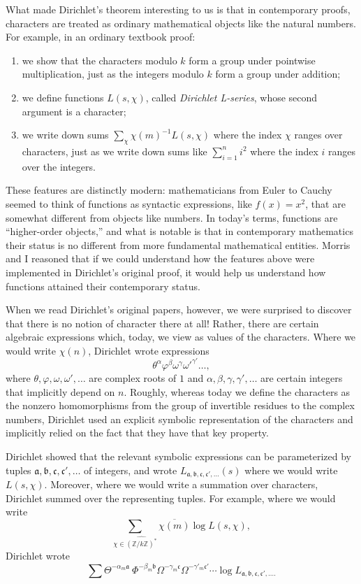 \documentclass[12pt]{article}
\newcommand{\ph}{\varphi}
\begin{document}
What made Dirichlet's theorem interesting to us is that in contemporary proofs, characters are treated as ordinary mathematical objects like the natural numbers. For example, in an ordinary textbook proof:
\begin{enumerate}
\item we show that the characters modulo $k$ form a group under pointwise multiplication, just as the integers modulo $k$ form a group under addition;
\item we define functions $L(s, \chi)$, called \emph{Dirichlet L-series}, whose second argument is a character;
\item we write down sums $\sum_\chi \chi(m)^{-1} L(s, \chi)$ where the index $\chi$ ranges over characters, just as we write down sums like $\sum_{i = 1}^{n} i^2$ where the index $i$ ranges over the integers.
\end{enumerate}
These features are distinctly modern: mathematicians from Euler to Cauchy seemed to think of functions as syntactic expressions, like $f(x) = x^2$, that are somewhat different from objects like numbers. In today's terms, functions are ``higher-order objects,'' and what is notable is that in contemporary mathematics their status is no different from more fundamental mathematical entities. Morris and I reasoned that if we could understand how the features above were implemented in Dirichlet's original proof, it would help us understand how functions attained their contemporary status. 

When we read Dirichlet's original papers, however, we were surprised to discover that there is no notion of character there at all! Rather, there are certain algebraic expressions which, today, we view as values of the characters. Where we would write $\chi(n)$, Dirichlet wrote expressions
\[
\theta^\alpha \ph^\beta \omega^\gamma \omega'^{\gamma'} \ldots,
\]
where $\theta, \ph, \omega, \omega', \ldots$ are complex roots of $1$ and $\alpha, \beta, \gamma, \gamma', \ldots$ are certain integers that implicitly depend on $n$. Roughly, whereas today we define the characters as the nonzero homomorphisms from the group of invertible residues to the complex numbers, Dirichlet used an explicit symbolic representation of the characters and implicitly relied on the fact that they have that key property.

Dirichlet showed that the relevant symbolic expressions can be parameterized by tuples $\mathfrak{a}, \mathfrak{b}, \mathfrak{c}, \mathfrak{c}', \ldots$ of integers, and wrote $L_{\mathfrak{a}, \mathfrak{b}, \mathfrak{c}, \mathfrak{c}',\ldots}(s)$ where we would write $L(s,\chi)$. Moreover, where we would write a summation over characters, Dirichlet summed over the representing tuples. For example, where we would write
\[
\sum_{\chi \in \widehat{(\mathbb{Z} / k \mathbb{Z})^*}}\overline{\chi(m)}\log L(s, \chi),
\]
Dirichlet wrote 
\[
\sum \Theta^{-\alpha_{m}\mathfrak{a}}\ \Phi^{-\beta_{m}\mathfrak{b}}\Omega^{-\gamma_{m}\mathfrak{c}}\Omega^{-\gamma'_{m}\mathfrak{c}'} \cdots \log L_{\mathfrak{a},\mathfrak{b},\mathfrak{c},\mathfrak{c}', \ldots.}
\]
\end{document}

